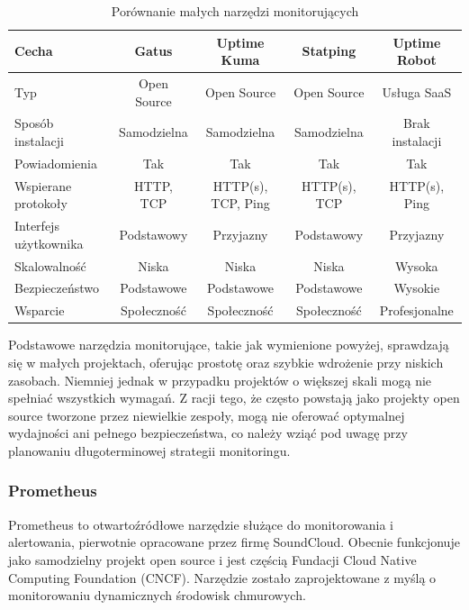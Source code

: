\documentclass{article}
\begin{document}
\begin{table}[H]
    \centering
    \begin{tabular}{|l|c|c|c|c|}
        \hline
        \textbf{Cecha} & \textbf{Gatus} & \textbf{Uptime Kuma} & \textbf{Statping} & \textbf{Uptime Robot} \\ \hline
        Typ & Open Source & Open Source & Open Source & Usługa SaaS \\ \hline
        Sposób instalacji & Samodzielna & Samodzielna & Samodzielna & Brak instalacji \\ \hline
        Powiadomienia & Tak & Tak & Tak & Tak \\ \hline
        Wspierane protokoły & HTTP, TCP & HTTP(s), TCP, Ping & HTTP(s), TCP & HTTP(s), Ping \\ \hline
        Interfejs użytkownika & Podstawowy & Przyjazny & Podstawowy & Przyjazny \\ \hline
        Skalowalność & Niska & Niska & Niska & Wysoka \\ \hline
        Bezpieczeństwo & Podstawowe & Podstawowe & Podstawowe & Wysokie \\ \hline
        Wsparcie & Społeczność & Społeczność & Społeczność & Profesjonalne \\ \hline
    \end{tabular}
    \caption{Porównanie małych narzędzi monitorujących}
    \label{tab:porownanie-malych-narzedzi}
\end{table}

Podstawowe narzędzia monitorujące, takie jak wymienione powyżej, sprawdzają się w małych projektach, oferując prostotę oraz szybkie wdrożenie przy niskich zasobach. Niemniej jednak w przypadku projektów o większej skali mogą nie spełniać wszystkich wymagań. Z racji tego, że często powstają jako projekty open source tworzone przez niewielkie zespoły, mogą nie oferować optymalnej wydajności ani pełnego bezpieczeństwa, co należy wziąć pod uwagę przy planowaniu długoterminowej strategii monitoringu.


\subsubsection{Prometheus}

Prometheus to otwartoźródłowe narzędzie służące do monitorowania i alertowania, pierwotnie opracowane przez firmę SoundCloud. Obecnie funkcjonuje jako samodzielny projekt open source i jest częścią Fundacji Cloud Native Computing Foundation (CNCF). Narzędzie zostało zaprojektowane z myślą o monitorowaniu dynamicznych środowisk chmurowych.
\end{document}
